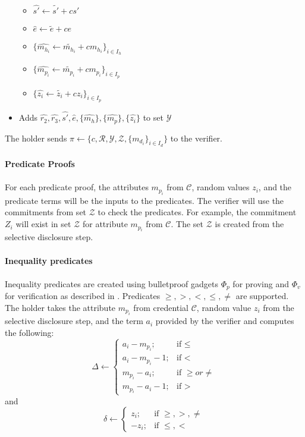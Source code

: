 \documentclass[a4paper]{article}
\begin{document}
\begin{itemize}
\begin{itemize}
        \item $\widehat{s'} \leftarrow \widetilde{s'} + c s'$
        \item $\widehat{e} \leftarrow \widetilde{e} + c e$
        \item $\{\widehat{m_{h_i}} \leftarrow \widetilde{m_{h_i}} + c m_{h_i}\}_{i \in I_h}$
        \item $\{\widehat{m_{p_i}} \leftarrow \widetilde{m_{p_i}} + c m_{p_i}\}_{i \in I_p}$
        \item $\{\widehat{z_i} \leftarrow \widetilde{z_i} + cz_i\}_{i \in I_p}$
        \end{itemize}
    \item Adds $\widehat{r_2},\widehat{r_3},\widehat{s'},\widehat{e},\{\widehat{m_h}\},\{\widehat{m_p}\},\{\widehat{z_i}\}$ to set $\mathcal{Y}$
\end{itemize}
The holder sends $\pi \leftarrow \{c, \mathcal{R}, \mathcal{Y}, \mathcal{Z}, \{m_{d_i}\}_{i \in I_d}\}$ to the verifier.\\\\
\textbf{Predicate Proofs}\\\\
For each predicate proof, the attributes $m_{p_i}$  from $\mathcal{C}$, random values $z_i$, and the
predicate terms will be the inputs to the predicates. The verifier will  use the commitments from
set $\mathcal{Z}$ to check the predicates. For example, the commitment $Z_i$ will exist in set
$\mathcal{Z}$ for attribute $m_{p_i}$ from $\mathcal{C}$. The set $\mathcal{Z}$ is created from the
selective disclosure step.\\\\
\textbf{Inequality predicates}\\\\
Inequality predicates are created using bulletproof gadgets $\Phi_p$ for proving and $\Phi_v$ for
verification as described in \cite{BBBPWM18}. Predicates $\geq,  >, <, \leq, \neq$ are supported.
The holder takes the attribute $m_{p_i}$ from credential $\mathcal{C}$, random value $z_i$ from the
selective disclosure step, and the term $a_i$ provided by the verifier and computes the following:
\[
\Delta \leftarrow \begin{cases}
a_i-m_{p_i}; & \mbox{if } \leq\\
a_i-m_{p_i}-1; & \mbox{if }  <\\
m_{p_i}-a_i; & \mbox{if } \geq or \neq\\
m_{p_i}-a_i-1; & \mbox{if } >
\end{cases}
\]
and 
\[
\delta \leftarrow \begin{cases}
z_i; &\mbox{if } \geq, >, \neq\\
-z_i; &\mbox{if } \leq, <
\end{cases}
\]
\end{document}
